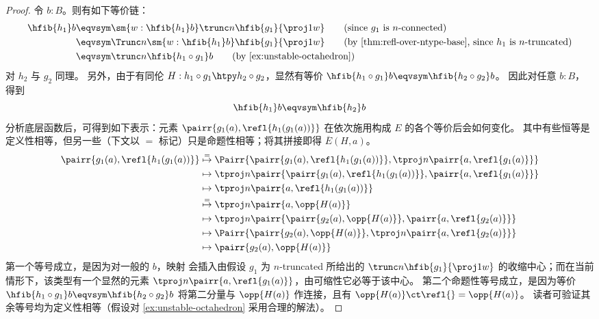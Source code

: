 \begin{proof}
令 $b:B$。则有如下等价链：
\begin{align}
\hfib{h_1}b
& \eqvsym \sm{w:\hfib{h_1}b} \trunc n{ \hfib{g_1}{\proj1 w}}
\tag{since $g_1$ is $n$-connected}\\
& \eqvsym \Trunc n{\sm{w:\hfib{h_1}b}\hfib{g_1}{\proj1 w}}
\tag{by \cref{thm:refl-over-ntype-base}, since $h_1$ is $n$-truncated}\\
& \eqvsym \trunc n{\hfib{h_1\circ g_1}b}
\tag{by \cref{ex:unstable-octahedron}}
\end{align}
对 $h_2$ 与 $g_2$ 同理。
另外，由于有同伦 $H:h_1\circ g_1\htpy h_2\circ g_2$，显然有等价 $\hfib{h_1\circ g_1}b\eqvsym\hfib{h_2\circ g_2}b$。
因此对任意 $b:B$，得到
\begin{equation*}
\hfib{h_1}b\eqvsym\hfib{h_2}b
\end{equation*}
分析底层函数后，可得到如下表示：元素
$\pairr{g_1(a),\refl{h_1(g_1(a))}}$
在依次施用构成 $E$ 的各个等价后会如何变化。
其中有些恒等是定义性相等，但另一些（下文以 $=$ 标记）只是命题性相等；将其拼接即得 $\overline E(H,a)$。
{\allowdisplaybreaks
\begin{align*}
\pairr{g_1(a),\refl{h_1(g_1(a))}} &
    \overset{=}{\mapsto} \Pairr{\pairr{g_1(a),\refl{h_1(g_1(a))}}, \tproj n{ \pairr{a,\refl{g_1(a)}}}}\\
  & \mapsto \tproj n { \pairr{\pairr{g_1(a),\refl{h_1(g_1(a))}}, \pairr{a,\refl{g_1(a)}} }}\\
  & \mapsto \tproj n { \pairr{a,\refl{h_1(g_1(a))}}}\\
  & \overset{=}{\mapsto} \tproj n { \pairr{a,\opp{H(a)}}}\\
  & \mapsto \tproj n { \pairr{\pairr{g_2(a),\opp{H(a)}},\pairr{a,\refl{g_2(a)}}} }\\
  & \mapsto \Pairr{\pairr{g_2(a),\opp{H(a)}}, \tproj n {\pairr{a,\refl{g_2(a)}}} }\\
  & \mapsto \pairr{g_2(a),\opp{H(a)}}
\end{align*}}
第一个等号成立，是因为对一般的 $b$，映射
会插入由假设 $g_1$ 为 $n$-truncated 所给出的 $\trunc n{ \hfib{g_1}{\proj1 w}}$ 的收缩中心；而在当前情形下，该类型有一个显然的元素 $\tproj n{ \pairr{a,\refl{g_1(a)}}}$，由可缩性它必等于该中心。
第二个命题性等号成立，是因为等价 $\hfib{h_1\circ g_1}b\eqvsym\hfib{h_2\circ g_2}b$ 将第二分量与 $\opp{H(a)}$ 作连接，且有 $\opp{H(a)} \ct \refl{} = \opp{H(a)}$。
读者可验证其余等号均为定义性相等（假设对 \cref{ex:unstable-octahedron} 采用合理的解法）。
\end{proof}

